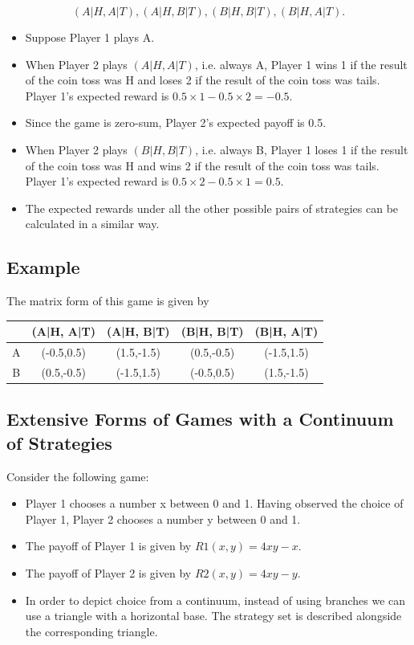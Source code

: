 \documentclass[]{report}
\begin{document}
\[(A|H, A|T), (A|H, B|T), (B|H, B|T), (B|H, A|T).\]

\begin{itemize}
	\item Suppose Player 1 plays A.
	\item	When Player 2 plays $(A|H, A|T)$, i.e. always A, Player 1 wins 1 if
	the result of the coin toss was H and loses 2 if the result of the
	coin toss was tails. Player 1’s expected reward is
	$0.5 × 1 − 0.5 × 2 = −0.5$. 
	\item Since the game is zero-sum, Player 2’s
	expected payoff is 0.5.
	\item	When Player 2 plays $(B|H, B|T)$, i.e. always B, Player 1 loses 1 if
	the result of the coin toss was H and wins 2 if the result of the
	coin toss was tails. Player 1’s expected reward is
	$0.5 × 2 − 0.5 × 1 = 0.5$.
	\item	The expected rewards under all the other possible pairs of
	strategies can be calculated in a similar way.
\end{itemize}


\subsection{Example}
The matrix form of this game is given by
\begin{tabular}{ccccc}
  & (A|H, A|T) & (A|H, B|T) & (B|H, B|T) &  (B|H, A|T)\\ \hline
A & (-0.5,0.5) & (1.5,-1.5) & (0.5,-0.5) & (-1.5,1.5) \\ \hline
B & (0.5,-0.5) & (-1.5,1.5) & (-0.5,0.5) & (1.5,-1.5) \\ \hline
\end{tabular}
\subsection{Extensive Forms of Games with a Continuum of Strategies}
Consider the following game:
\begin{itemize}
	\item Player 1 chooses a number x between 0 and 1. Having observed
	the choice of Player 1, Player 2 chooses a number y between 0 and
	1.
	\item The payoff of Player 1 is given by $R1(x, y) = 4xy - x$. 
	\item The payoff
	of Player 2 is given by $R2(x, y) = 4xy - y$.
	\item In order to depict choice from a continuum, instead of using
	branches we can use a triangle with a horizontal base. The
	strategy set is described alongside the corresponding triangle.
\end{itemize}
\end{document}
